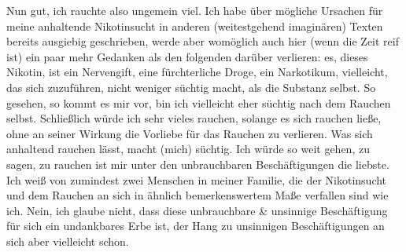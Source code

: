 \documentclass{scrbook}
\begin{document}
Nun gut, ich rauchte also ungemein viel. Ich habe über mögliche Ursachen
für meine anhaltende Nikotinsucht in
anderen (weitestgehend imaginären) Texten bereits ausgiebig geschrieben,
werde aber womöglich auch hier (wenn die Zeit reif ist) ein paar mehr
Gedanken als den folgenden darüber verlieren: es, dieses Nikotin, ist ein Nervengift, eine
fürchterliche Droge, ein Narkotikum, vielleicht, das sich zuzuführen, nicht weniger süchtig macht, als
die Substanz selbst. So gesehen, so kommt es mir vor, bin ich vielleicht eher süchtig 
nach dem Rauchen selbst. Schließlich würde ich sehr vieles rauchen, solange es sich rauchen ließe,
ohne an seiner Wirkung die Vorliebe für das Rauchen zu verlieren. Was sich 
anhaltend rauchen lässt, macht (mich) süchtig.
Ich würde so weit gehen, zu sagen, zu rauchen ist mir unter den
unbrauchbaren Beschäftigungen die liebste. Ich weiß von zumindest zwei Menschen
in meiner Familie, die der Nikotinsucht und dem Rauchen an sich in ähnlich
bemerkenswertem Maße verfallen sind wie ich. Nein, ich glaube nicht, dass 
diese unbrauchbare \& unsinnige Beschäftigung für sich ein undankbares Erbe ist, der
Hang zu unsinnigen Beschäftigungen an sich aber vielleicht schon. 
\end{document}
